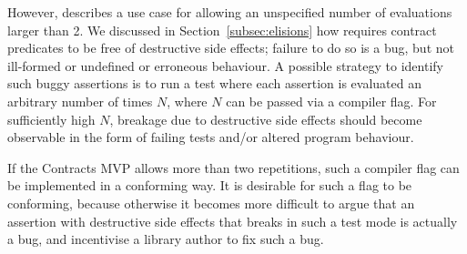 However, \cite{P3119R0} describes a use case for allowing an unspecified number of evaluations larger than 2. We discussed in Section~\ref{subsec:elisions} how \cite{P2900R6} requires contract predicates to be free of destructive side effects; failure to do so is a bug, but not ill-formed or undefined or erroneous behaviour. A possible strategy to identify such buggy assertions is to run a test where each assertion is evaluated an arbitrary number of times $N$, where $N$ can be passed via a compiler flag. For sufficiently high $N$, breakage due to destructive side effects should become observable in the form of failing tests and/or altered program behaviour.

If the Contracts MVP allows more than two repetitions, such a compiler flag can be implemented in a conforming way. It is desirable for such a flag to be conforming, because otherwise it becomes more difficult to argue that an assertion with destructive side effects that breaks in such a test mode is actually a bug, and incentivise a library author to fix such a bug.

